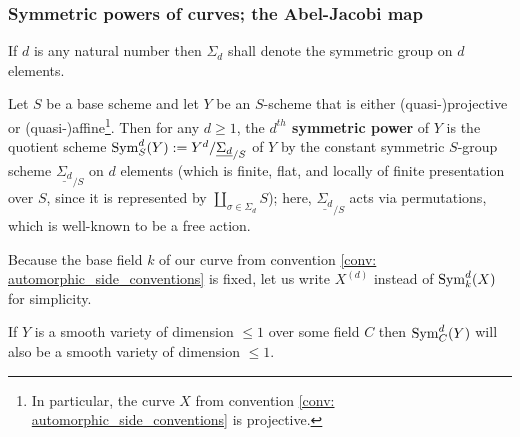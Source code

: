         \subsubsection{Symmetric powers of curves; the Abel-Jacobi map}
            \begin{convention} \label{conv: symmetric_group}
                If $d$ is any natural number then $\Sigma_d$ shall denote the symmetric group on $d$ elements.
            \end{convention}
            \begin{definition} \label{def: symmetric_powers_of_schemes}
                Let $S$ be a base scheme and let $Y$ be an $S$-scheme that is either (quasi-)projective or (quasi-)affine\footnote{In particular, the curve $X$ from convention \ref{conv: automorphic_side_conventions} is projective.}. Then for any $d \geq 1$, the \textbf{$d^{th}$ symmetric power} of $Y$ is the quotient scheme $\mathrm{Sym}^d_S(Y) := Y^d/\underline{\Sigma_d}_{/S}$ of $Y$ by the constant symmetric $S$-group scheme $\underline{\Sigma_d}_{/S}$ on $d$ elements (which is finite, flat, and locally of finite presentation over $S$, since it is represented by $\coprod_{\sigma \in \Sigma_d} S$); here, $\underline{\Sigma_d}_{/S}$ acts via permutations, which is well-known to be a free action.
            \end{definition}
            \begin{convention}
                Because the base field $k$ of our curve from convention \ref{conv: automorphic_side_conventions} is fixed, let us write $X^{(d)}$ instead of $\mathrm{Sym}^d_k(X)$ for simplicity.
            \end{convention}
            \begin{lemma} \label{lemma: smoothness_of_symmetric_powers}
                If $Y$ is a smooth variety of dimension $\leq 1$ over some field $C$ then $\mathrm{Sym}_C^d(Y)$ will also be a smooth variety of dimension $\leq 1$.
            \end{lemma}
